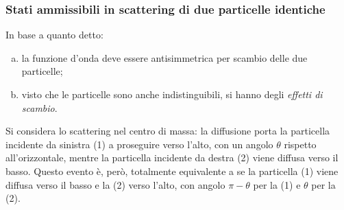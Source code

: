 \documentclass[11pt, a4paper]{scrartcl}
\theoremstyle{style}
\numberwithin{equation}{subsection}
\begin{document}
\subsubsection{Stati ammissibili in scattering di due particelle identiche}

In base a quanto detto:
\begin{enumerate}[(a).]
	\item la funzione d'onda deve essere antisimmetrica per scambio delle due particelle;
	\item visto che le particelle sono anche indistinguibili, si hanno degli \textit{effetti di scambio}.
\end{enumerate}
Si considera lo scattering nel centro di massa: la diffusione porta la particella incidente da sinistra (1) a proseguire verso l'alto, con un angolo $\theta $ rispetto all'orizzontale, mentre la particella incidente da destra (2) viene diffusa verso il basso.
Questo evento \`e, per\`o, totalmente equivalente a se la particella (1) viene diffusa verso il basso e la (2) verso l'alto, con angolo $\pi- \theta $ per la (1) e $\theta $ per la (2).
\end{document}
